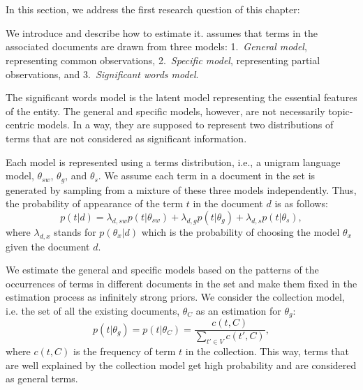\section{\SWLMs}
\label{sec:swlm}
In this section, we address the first research question of this chapter: 

We introduce \SWLMs and describe how to estimate it. \acswlm assumes that terms in the associated documents are drawn from three models: 1.~\emph{General model}, representing common observations, 2.~\emph{Specific model}, representing partial observations, and 3.~\emph{Significant words model}. 

The significant words model is the latent model representing the essential features of the entity. The general and specific models, however, are not necessarily topic-centric models. In a way, they are supposed to represent two distributions of terms that are not considered as significant information. 

Each model is represented using a terms distribution, i.e., a unigram language model, $\theta_{sw}$, $\theta_g$, and $\theta_s$. 
We assume each term in a document in the set is generated by sampling from a mixture of these three models independently. Thus, the probability of appearance of the term $t$ in the document $d$ is as follows:
\begin{equation}
p(t|d) =  \lambda_{d,sw} p(t|\theta_{sw}) + \lambda_{d,g} p(t|\theta_g) + \lambda_{d,s} p(t|\theta_s),
\end{equation}
where $\lambda_{d,x}$ stands for $p(\theta_x|d)$ which is the probability of choosing the model $\theta_x$ given the document $d$. 

We estimate the general and specific models based on the patterns of the occurrences of terms in different documents in the set and make them fixed in the estimation process as infinitely strong priors. 
We consider the collection model, i.e. the set of all the existing documents, $\theta_C$ as an estimation for $\theta_g$:
\begin{equation}
p(t|\theta_g) = 
p(t|\theta_C) = \frac{c(t,C)}{\sum_{t' \in V} c(t',C)},
\end{equation} 
where $c(t,C)$ is the frequency of term $t$ in the collection. This way, terms that are well explained by the collection model get high probability and are considered as general terms.

